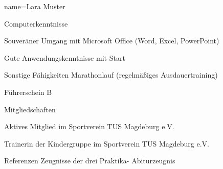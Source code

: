 \documentclass[a4paper, 12pt]{classycv}
\begin{document}
\begin{Resume}{%
	name=Lara Muster%
}
%
\begin{Entry}{Computerkenntnisse}{}%
    \begin{List}[skip above=0pt]%
        \item Souveräner Umgang mit Microsoft Office (Word, Excel, PowerPoint)
        \item Gute Anwendungskenntnisse mit Start
    \end{List}
\end{Entry}
%
\begin{Entry}{Sonstige Fähigkeiten}{}%
    Marathonlauf (regelmäßiges Ausdauertraining)%
\end{Entry}
%
\begin{Entry}{Führerschein}{}%
    B%
\end{Entry}
%
%
%
\begin{Entry}{Mitgliedschaften}{}%
    \begin{List}[skip above=0pt]%
        \item Aktives Mitglied im Sportverein TUS Magdeburg e.V. 
        \item Trainerin der Kindergruppe im Sportverein TUS Magdeburg e.V.
    \end{List}
\end{Entry}
% 
\begin{Entry}{Referenzen}{}%
    Zeugnisse der drei Praktika- Abiturzeugnis
\end{Entry}
\end{Resume}
\end{document}

